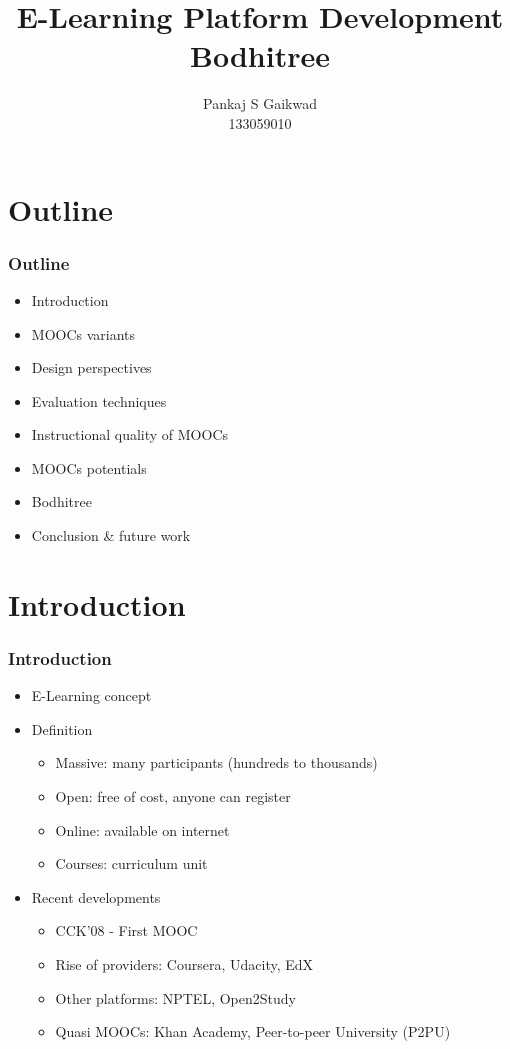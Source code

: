 \documentclass[13pt]{beamer}
\title{E-Learning Platform Development \\ Bodhitree}
\author{Pankaj S Gaikwad \\ 133059010 }
\begin{document}
\maketitle

\section{Outline}
\begin{frame}
    \frametitle{Outline}
    \begin{itemize}
	\item Introduction
	\item MOOCs variants
	\item Design perspectives
	\item Evaluation techniques
	\item Instructional quality of MOOCs
	\item MOOCs potentials
	\item Bodhitree
	\item Conclusion \& future work
    \end{itemize}
\end{frame}



\section{Introduction}
\begin{frame}
	\frametitle{Introduction}

	\begin{itemize}
	  \item E-Learning concept
	  \item Definition
	   \begin{itemize}
		 \item Massive: many participants (hundreds to thousands)
		 \item Open: free of cost, anyone can register
		 \item Online: available on internet
		 \item Courses: curriculum unit
	  \end{itemize}
	  \item Recent developments
	  \begin{itemize}
		 \item CCK'08 - First MOOC
		 \item Rise of providers: Coursera, Udacity, EdX
		 \item Other platforms: NPTEL, Open2Study
		 \item Quasi MOOCs: Khan Academy, Peer-to-peer University (P2PU)
	  \end{itemize}
	\end{itemize}
\end{frame}
\end{document}
